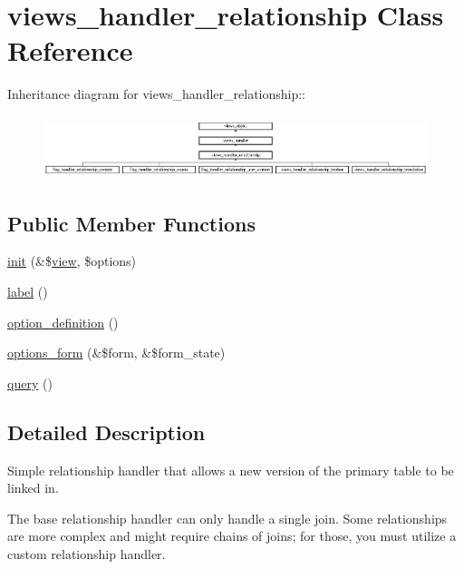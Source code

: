 \hypertarget{classviews__handler__relationship}{
\section{views\_\-handler\_\-relationship Class Reference}
\label{classviews__handler__relationship}
}
Inheritance diagram for views\_\-handler\_\-relationship::\begin{figure}[H]
\begin{center}
\leavevmode
\includegraphics[height=1.84362cm]{classviews__handler__relationship}
\end{center}
\end{figure}
\subsection*{Public Member Functions}
\begin{CompactItemize}
\item 
\hyperlink{classviews__handler__relationship_a50c5d9c6b52fa2eeed61e88a74bc083}{init} (\&\$\hyperlink{classview}{view}, \$options)
\item 
\hyperlink{classviews__handler__relationship_f39d860cac5cd67836901304a08b43a0}{label} ()
\item 
\hyperlink{classviews__handler__relationship_7e7b7a0056836612aa50a60575a3d549}{option\_\-definition} ()
\item 
\hyperlink{classviews__handler__relationship_08cc3f5947964d936b5e88d198f82c30}{options\_\-form} (\&\$form, \&\$form\_\-state)
\item 
\hyperlink{classviews__handler__relationship_7dc0b6371807dbf06efa594cb52b3348}{query} ()
\end{CompactItemize}


\subsection{Detailed Description}
Simple relationship handler that allows a new version of the primary table to be linked in.

The base relationship handler can only handle a single join. Some relationships are more complex and might require chains of joins; for those, you must utilize a custom relationship handler.

